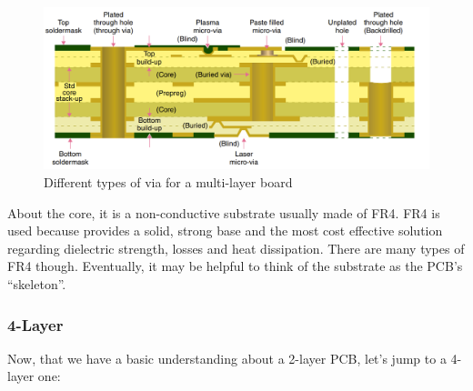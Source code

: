 \documentclass[final]{cubedoc}
\begin{document}
	\begin{figure}[h!]
		\centering
		\includegraphics[width=\textwidth, height=.25\textheight]{assets/via.png}
		\caption{Different types of via for a multi-layer board \cite[p.4]{mitzner2011complete}}
	\end{figure}
	
	About the core, it is a non-conductive substrate usually made of FR4. FR4 is used because provides a solid, strong base and the most cost effective solution regarding dielectric strength, losses and heat dissipation. There are many types of FR4 though. Eventually, it may be helpful to think of the substrate as the PCB’s “skeleton”. 
	
	
	\subsubsection{4-Layer}
	Now, that we have a basic understanding about a 2-layer PCB, let’s jump to a 4-layer one:
	
\end{document}
